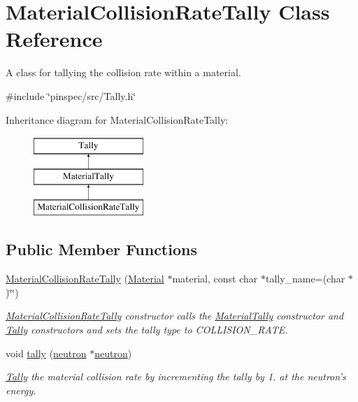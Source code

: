 \hypertarget{classMaterialCollisionRateTally}{\section{Material\-Collision\-Rate\-Tally Class Reference}
\label{classMaterialCollisionRateTally}
}


A class for tallying the collision rate within a material.  




{\ttfamily \#include \char`\"{}pinspec/src/\-Tally.\-h\char`\"{}}

Inheritance diagram for Material\-Collision\-Rate\-Tally\-:\begin{figure}[H]
\begin{center}
\leavevmode
\includegraphics[height=3.000000cm]{classMaterialCollisionRateTally}
\end{center}
\end{figure}
\subsection*{Public Member Functions}
\begin{DoxyCompactItemize}
\item 
\hyperlink{classMaterialCollisionRateTally_a7513b0942fa1eab1a316c0f6dd5e7fdf}{Material\-Collision\-Rate\-Tally} (\hyperlink{classMaterial}{Material} $\ast$material, const char $\ast$tally\-\_\-name=(char $\ast$)\char`\"{}\char`\"{})
\begin{DoxyCompactList}\small\item\em \hyperlink{classMaterialCollisionRateTally}{Material\-Collision\-Rate\-Tally} constructor calls the \hyperlink{classMaterialTally}{Material\-Tally} constructor and \hyperlink{classTally}{Tally} constructors and sets the tally type to C\-O\-L\-L\-I\-S\-I\-O\-N\-\_\-\-R\-A\-T\-E. \end{DoxyCompactList}\item 
void \hyperlink{classMaterialCollisionRateTally_a3da8ad061bf2b1501a4f6a191ad5dfd9}{tally} (\hyperlink{structneutron}{neutron} $\ast$\hyperlink{structneutron}{neutron})
\begin{DoxyCompactList}\small\item\em \hyperlink{classTally}{Tally} the material collision rate by incrementing the tally by 1. at the neutron's energy. \end{DoxyCompactList}\end{DoxyCompactItemize}
